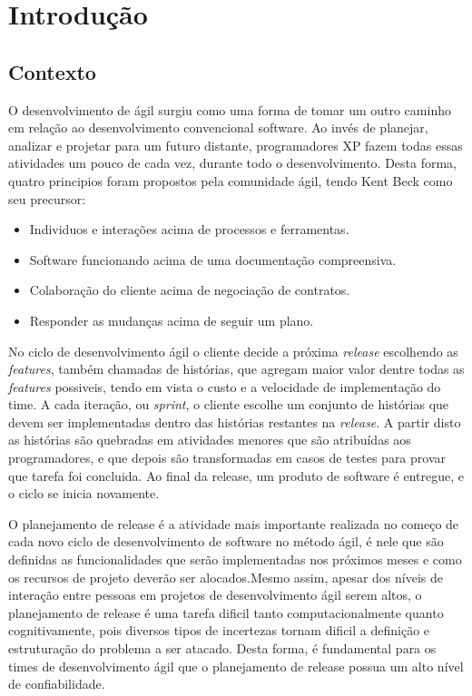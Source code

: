 \chapter{Introdução}
\section{Contexto}
O desenvolvimento de ágil surgiu como uma forma de tomar um outro
caminho em relação ao desenvolvimento convencional software. Ao invés de planejar,
analizar e projetar para um futuro distante, programadores XP fazem todas essas
atividades um pouco de cada vez, durante todo o desenvolvimento\cite{XP}.
Desta forma, quatro principios foram propostos pela comunidade ágil, tendo Kent
Beck como seu precursor\cite{beckManifesto}:
\begin{itemize}
    \item Individuos e interações acima de processos e ferramentas.
    \item Software funcionando acima de uma documentação compreensiva.
    \item Colaboração do cliente acima de negociação de contratos.
    \item Responder as mudanças acima de seguir um plano.
\end{itemize}

No ciclo de desenvolvimento ágil o cliente decide a próxima \textit{release}
escolhendo as \textit{features}, também chamadas de histórias, que agregam
maior valor dentre todas as \textit{features} possiveis, tendo em vista  o custo
e a velocidade de implementação do time. A cada iteração, ou \textit{sprint}, o
cliente escolhe um conjunto de  histórias que devem ser implementadas dentro das
histórias restantes na \textit{release}. A partir disto as histórias são quebradas em
atividades menores que são atribuídas aos programadores, e que depois são
transformadas em casos de testes para provar que tarefa foi concluida\cite{XP}.
Ao final da release, um produto de software é entregue, e o ciclo se inicia
novamente.

O planejamento de release é a atividade mais importante realizada no começo de
cada novo ciclo de desenvolvimento de software no método ágil, é nele que são
definidas as funcionalidades que serão implementadas nos próximos meses e como
os recursos de projeto deverão ser alocados.Mesmo assim, apesar dos níveis de
interação entre pessoas em projetos de desenvolvimento ágil serem altos,
o planejamento de  release é uma tarefa dificil tanto computacionalmente quanto
cognitivamente, pois diversos tipos de incertezas tornam dificil a definição e
estruturação do problema a ser atacado\cite{Ngo}. Desta forma, é fundamental para
os times de desenvolvimento ágil que o planejamento de release possua um alto
nível de confiabilidade\cite{McDaid}.

